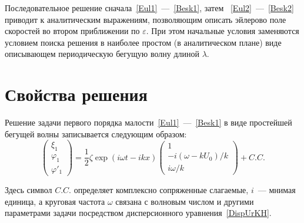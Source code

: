Последовательное решение сначала~\eqref{Eul1}~---~\eqref{Besk1},
затем ~\eqref{Eul2}~---~\eqref{Besk2}  приводит к аналитическим выражениям, позволяющим описать эйлерово
поле скоростей во втором приближении по $\varepsilon $. При этом начальные условия заменяются условием поиска решения в наиболее простом (в аналитическом плане) виде описывающем периодическую бегущую волну длиной $ \lambda $.

\section{Свойства решения} \label{sec:ch2/sec3}

Решение задачи первого порядка малости~\eqref{Eul1}~---~\eqref{Besk1} в виде простейшей бегущей волны записывается следующим образом:
\begin{equation}
\begin{pmatrix}
\xi_{1}
\\
\varphi_{1}
\\
\varphi'_{1}
\end{pmatrix}= \dfrac{1}{2}\zeta \exp \left( i\omega t-i k x\right) \begin{pmatrix}
1
\\
-i\left(\omega -k U_{0}\right)/k
\\
i \omega/k
\end{pmatrix}+ C.C. 
\label{Resh1}
\end{equation}

Здесь символ $ C.C. $ определяет комплексно сопряженные слагаемые, $ i $~--- мнимая единица, а круговая частота $ \omega $ связана с волновым числом и другими параметрами задачи посредством дисперсионного уравнения~\eqref{DispUrKH}.

